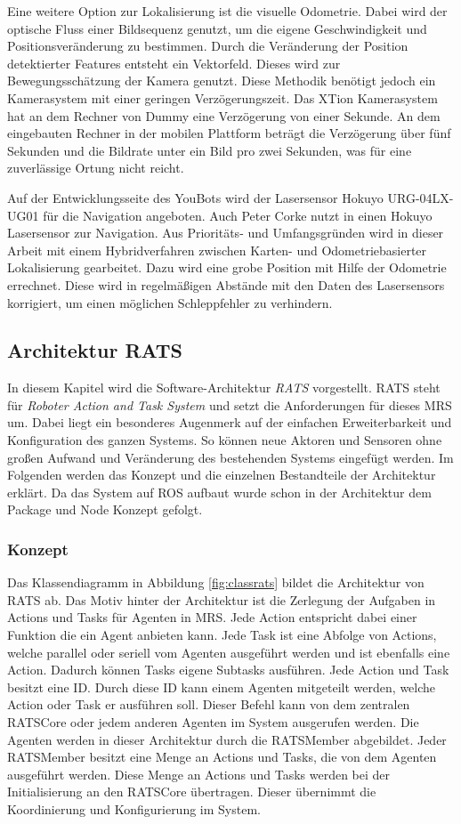 Eine weitere Option zur Lokalisierung ist die visuelle Odometrie. Dabei wird der optische Fluss einer Bildsequenz genutzt, um die eigene Geschwindigkeit und Positionsveränderung zu bestimmen. Durch die Veränderung der Position detektierter Features entsteht ein Vektorfeld. Dieses wird zur Bewegungsschätzung der Kamera genutzt. Diese Methodik benötigt jedoch ein Kamerasystem mit einer geringen Verzögerungszeit. Das XTion Kamerasystem hat an dem Rechner von Dummy eine Verzögerung von einer Sekunde. An dem eingebauten Rechner in der mobilen Plattform beträgt die Verzögerung über fünf Sekunden und die Bildrate unter ein Bild pro zwei Sekunden, was für eine zuverlässige Ortung nicht reicht.

Auf der Entwicklungsseite des YouBots wird der Lasersensor Hokuyo URG-04LX-UG01 für die Navigation angeboten. Auch Peter Corke nutzt in \cite[Kapitel 6]{Corke2011} einen Hokuyo Lasersensor zur Navigation. Aus Prioritäts- und Umfangsgründen wird in dieser Arbeit mit einem Hybridverfahren zwischen Karten- und Odometriebasierter Lokalisierung gearbeitet. Dazu wird eine grobe Position mit Hilfe der Odometrie errechnet. Diese wird in regelmäßigen Abstände mit den Daten des Lasersensors korrigiert, um einen möglichen Schleppfehler zu verhindern.

\subsection{Architektur RATS}
In diesem Kapitel wird die Software-Architektur \textit{RATS} vorgestellt. RATS steht für \textit{Roboter Action and Task System} und setzt die Anforderungen für dieses MRS um. Dabei liegt ein besonderes Augenmerk auf der einfachen Erweiterbarkeit und Konfiguration des ganzen Systems. So können neue Aktoren und Sensoren ohne großen Aufwand und Veränderung des bestehenden Systems eingefügt werden. Im Folgenden werden das Konzept und die einzelnen Bestandteile der Architektur erklärt. Da das System auf ROS aufbaut wurde schon in der Architektur dem Package und Node Konzept gefolgt.

\subsubsection{Konzept}
Das Klassendiagramm in Abbildung \ref{fig:classrats} bildet die Architektur von RATS ab. Das Motiv hinter der Architektur ist die Zerlegung der Aufgaben in Actions und Tasks für Agenten in MRS. Jede Action entspricht dabei einer Funktion die ein Agent anbieten kann. Jede Task ist eine Abfolge von Actions, welche parallel oder seriell vom Agenten ausgeführt werden und ist ebenfalls eine Action. Dadurch können Tasks eigene Subtasks ausführen. Jede Action und Task besitzt eine ID. Durch diese ID kann einem Agenten mitgeteilt werden, welche Action oder Task er ausführen soll. Dieser Befehl kann von dem zentralen RATSCore oder jedem anderen Agenten im System ausgerufen werden. Die Agenten werden in dieser Architektur durch die RATSMember abgebildet. Jeder RATSMember besitzt eine Menge an Actions und Tasks, die von dem Agenten ausgeführt werden. Diese Menge an Actions und Tasks werden bei der Initialisierung an den RATSCore übertragen. Dieser übernimmt die Koordinierung und Konfigurierung im System.


